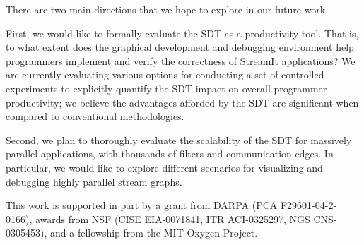\documentclass{csailabstractbook}
\begin{document}

There are  two main directions that  we hope to explore  in our future
work.

First, we  would like to formally  evaluate the SDT  as a productivity
tool.   That is,  to what  extent does  the graphical  development and
debugging  environment  help  programmers  implement  and  verify  the
correctness  of StreamIt  applications?  We  are  currently evaluating
various  options for  conducting a  set of  controlled  experiments to
explicitly quantify the SDT impact on overall programmer productivity;
we believe  the advantages  afforded by the  SDT are  significant when
compared to conventional methodologies.  

Second, we plan to thoroughly  evaluate the scalability of the SDT for
massively  parallel  applications,   with  thousands  of  filters  and
communication  edges.   In  particular,   we  would  like  to  explore
different  scenarios  for visualizing  and  debugging highly  parallel
stream graphs.


This work is supported in part by a grant from DARPA (PCA
F29601-04-2-0166), awards from NSF (CISE EIA-0071841, ITR ACI-0325297,
NGS CNS-0305453), and a fellowship from the MIT-Oxygen Project.


\end{document}
